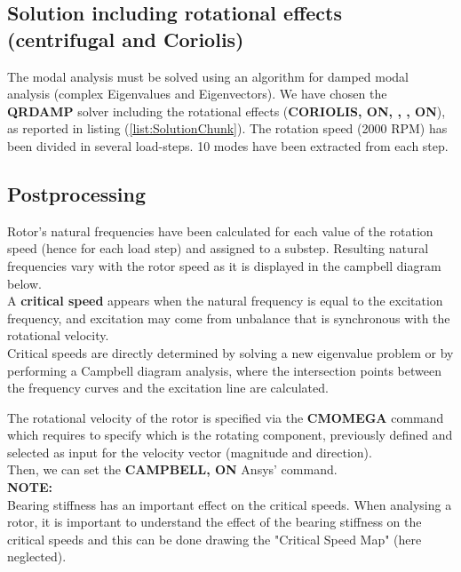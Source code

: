 \clearpage
\subsection*{Solution including rotational effects (centrifugal and Coriolis)}
\noindent
The modal analysis must be solved using an algorithm for damped modal analysis (complex Eigenvalues and Eigenvectors). We have chosen the \textbf{QRDAMP} solver including the rotational effects (\textbf{CORIOLIS, ON, , , ON}), as reported in listing (\ref{list:SolutionChunk}). The rotation speed (2000 RPM) has been divided in several load-steps. 10 modes have been extracted from each step. 



\subsection*{Postprocessing}
\noindent
Rotor's natural frequencies have been calculated for each value of the rotation speed (hence for each load step) and assigned to a substep. Resulting natural frequencies vary with the rotor speed as it is displayed in the campbell diagram below. \\
A \textbf{critical speed} appears when the natural frequency is equal to the excitation frequency, and excitation may come from unbalance that is synchronous with the rotational velocity. \\
Critical speeds are directly determined by solving a new eigenvalue problem or by performing a Campbell diagram analysis, where the intersection points between the frequency curves and the excitation line are calculated.

\noindent
The rotational velocity of the rotor is specified via the \textbf{CMOMEGA} command which requires to specify which is the rotating component, previously defined and selected as input for the velocity vector (magnitude and direction). \\
Then, we can set the \textbf{CAMPBELL, ON} Ansys' command. \\

\noindent
\textbf{NOTE:} \\
Bearing stiffness has an important effect on the critical speeds. When analysing a rotor, it is important to understand the effect of the bearing stiffness on the critical speeds and this can be done drawing the "Critical Speed Map" (here neglected).

